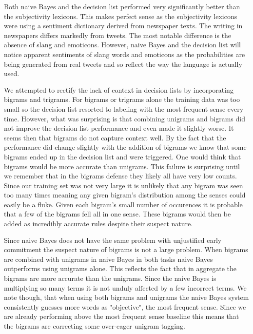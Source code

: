 \documentclass[11pt]{article}
\begin{document}
Both naive Bayes and the decision list performed very significantly better than the subjectivity lexicons. This makes perfect sense as the subjectivity lexicons were using a sentiment dictionary derived from newspaper texts. The writing in newspapers differs markedly from tweets. The most notable difference is the absence of slang and emoticons. However, naive Bayes and the decision list will notice apparent sentiments of slang words and emoticons as the probabilities are being generated from real tweets and so reflect the way the language is actually used.

We attempted to rectify the lack of context in decision lists by incorporating bigrams and trigrams. For bigrams or trigrams alone the training data was too small so the decision list resorted to labeling with the most frequent sense every time. However, what was surprising is that combining unigrams and bigrams did not improve the decision list performance and even made it slightly worse. It seems then that bigrams do not capture context well. By the fact that the performance did change slightly with the addition of bigrams we know that some bigrams ended up in the decision list and were triggered. One would think that bigrams would be more accurate than unigrams. This failure is surprising until we remember that in the bigrams defense they likely all have very low counts. Since our training set was not very large it is unlikely that any bigram was seen too many times meaning any given bigram's distribution among the senses could easily be a fluke. Given each bigram's small number of occurences it is probable that a few of the bigrams fell all in one sense. These bigrams would then be added as incredibly accurate rules despite their suspect nature.

Since naive Bayes does not have the same problem with unjustified early commitment the suspect nature of bigrams is not a large problem. When bigrams are combined with unigrams in naive Bayes in both tasks naive Bayes outperforms using unigrams alone. This reflects the fact that in aggregate the bigrams are more accurate than the unigrams. Since the naive Bayes is multiplying so many terms it is not unduly affected by a few incorrect terms. We note though, that when using both bigrams and unigrams the naive Bayes system consistently guesses more words as "objective", the most frequent sense. Since we are already performing above the most frequent sense baseline this means that the bigrams are correcting some over-eager unigram tagging. 
\end{document}
